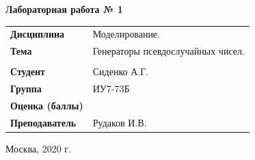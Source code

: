 \documentclass[a4paper,14pt]{extreport} %
\begin{document}
\begin{titlepage}
    \vspace{2cm}

    \begin{center}
        \textbf{Лабораторная работа № 1} \\
        \vspace{0.5cm}
    \end{center}

    \vspace{4cm}

    \begin{flushleft}
        \begin{tabular}{ll}
            \textbf{Дисциплина} & Моделирование.  \\
            \textbf{Тема} & Генераторы псевдослучайных чисел.  \\
            \\
            \textbf{Студент} & Сиденко А.Г. \\
            \textbf{Группа} & ИУ7-73Б \\
            \textbf{Оценка (баллы)} & \\
            \textbf{Преподаватель} & Рудаков И.В.   \\
        \end{tabular}
    \end{flushleft}

    \vspace{4cm}

   \begin{center}
        Москва, 2020 г.
    \end{center}

\end{titlepage}
\end{document}
